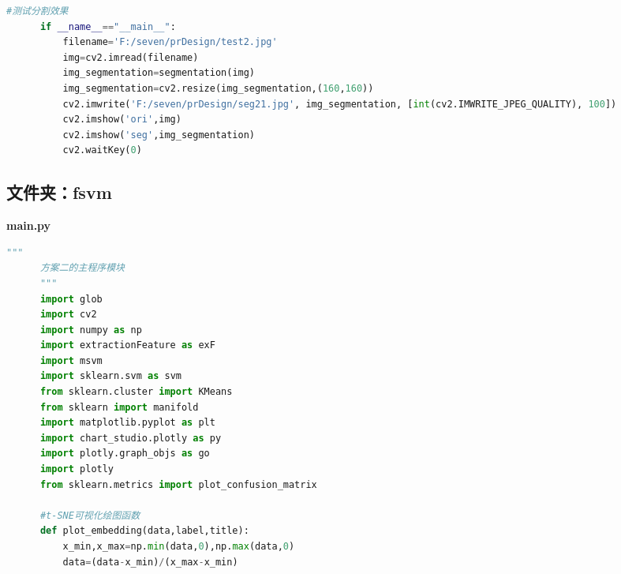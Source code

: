 \documentclass[supercite]{HustGraduPaper}
\begin{document}
\begin{sloppypar}
\begin{appendices}
\begin{spacing}{1.25}
\begin{lstlisting}[language=python]
      #测试分割效果
      if __name__=="__main__":
          filename='F:/seven/prDesign/test2.jpg'
          img=cv2.imread(filename)
          img_segmentation=segmentation(img)
          img_segmentation=cv2.resize(img_segmentation,(160,160))
          cv2.imwrite('F:/seven/prDesign/seg21.jpg', img_segmentation, [int(cv2.IMWRITE_JPEG_QUALITY), 100])
          cv2.imshow('ori',img)
          cv2.imshow('seg',img_segmentation)
          cv2.waitKey(0)
    \end{lstlisting}
  \end{spacing}

  \subsection{文件夹：fsvm}
  \textbf{main.py}
    \begin{spacing}{1.25}
    \begin{lstlisting}[language=python]
      """
      方案二的主程序模块
      """
      import glob
      import cv2
      import numpy as np
      import extractionFeature as exF
      import msvm
      import sklearn.svm as svm
      from sklearn.cluster import KMeans
      from sklearn import manifold
      import matplotlib.pyplot as plt
      import chart_studio.plotly as py
      import plotly.graph_objs as go
      import plotly
      from sklearn.metrics import plot_confusion_matrix
      
      #t-SNE可视化绘图函数
      def plot_embedding(data,label,title):
          x_min,x_max=np.min(data,0),np.max(data,0)
          data=(data-x_min)/(x_max-x_min)
      

\end{lstlisting}
\end{spacing}
\end{appendices}
\end{sloppypar}
\end{document}

